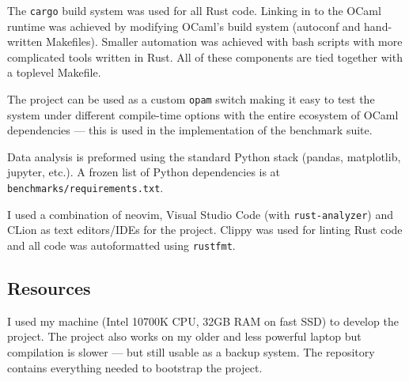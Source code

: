 
The \texttt{cargo} build system was used for all Rust code. Linking in to the OCaml runtime was
achieved by modifying OCaml's build system (autoconf and hand-written Makefiles). Smaller
automation was achieved with bash scripts with more complicated tools written in Rust.	All of
these components are tied together with a toplevel Makefile.

The project can be used as a custom \texttt{opam} switch making it easy to test the system under
different compile-time options with the entire ecosystem of OCaml dependencies --- this is used in
the implementation of the benchmark suite.

Data analysis is preformed using the standard Python stack (pandas, matplotlib, jupyter, etc.). A
frozen
list of Python dependencies is at \texttt{benchmarks/requirements.txt}.

I used a combination of neovim, Visual Studio Code (with \texttt{rust-analyzer}) and CLion as text
editors/IDEs for the project.  Clippy was used for linting Rust code and all code was autoformatted
using \texttt{rustfmt}.

\subsection{Resources}

I used my machine (Intel 10700K CPU, 32GB RAM on fast SSD) to develop the project. The project also
works on my older and less powerful laptop but compilation is slower --- but still usable as a
backup system. The repository contains everything needed to bootstrap the project.